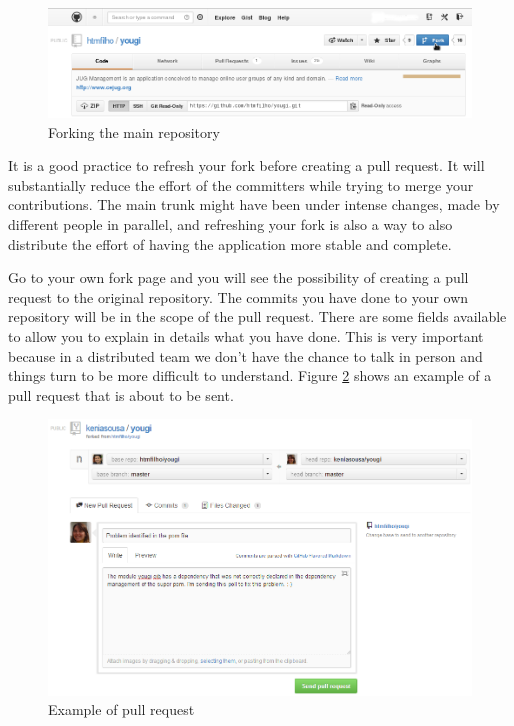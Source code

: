 \documentclass[envcountsame,envcountchap]{svmono}
\begin{document}
\begin{figure}
\centering
\includegraphics[scale=.34]{figures/github-fork}
\caption{Forking the main repository}
\label{fig:github-fork}
\end{figure}

It is a good practice to refresh your fork before creating a pull request. It will substantially reduce the effort of the committers while trying to merge your contributions. The main trunk might have been under intense changes, made by different people in parallel, and refreshing your fork is also a way to also distribute the effort of having the application more stable and complete.

Go to your own fork page and you will see the possibility of creating a pull request to the original repository. The commits you have done to your own repository will be in the scope of the pull request. There are some fields available to allow you to explain in details what you have done. This is very important because in a distributed team we don't have the chance to talk in person and things turn to be more difficult to understand. Figure \ref{fig:github-pull-request-example} shows an example of a pull request that is about to be sent.

\begin{figure}
\centering
\includegraphics[scale=.46]{figures/github-pull-request-example}
\caption{Example of pull request}
\label{fig:github-pull-request-example}
\end{figure}
\end{document}
